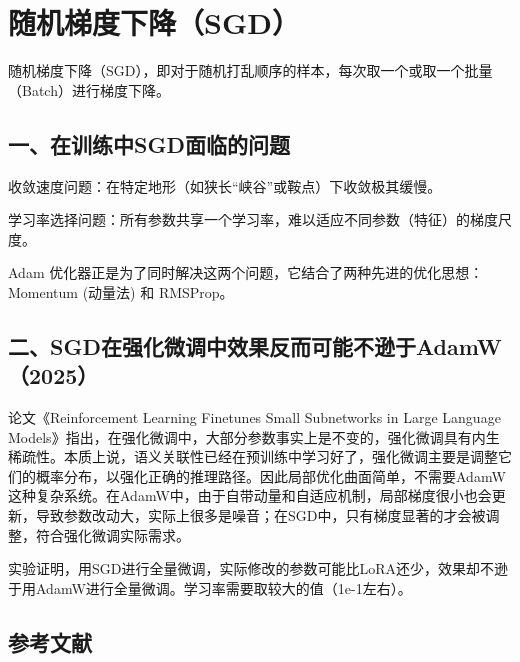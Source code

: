 \setcounter{section}{0}

\hypertarget{ux968fux673aux68afux5ea6ux4e0bux964dsgd}{%
\section{随机梯度下降（SGD）}\label{ux968fux673aux68afux5ea6ux4e0bux964dsgd}}

随机梯度下降（SGD），即对于随机打乱顺序的样本，每次取一个或取一个批量（Batch）进行梯度下降。

\hypertarget{ux4e00ux5728ux8badux7ec3ux4e2dsgdux9762ux4e34ux7684ux95eeux9898}{%
\subsection{一、在训练中SGD面临的问题}\label{ux4e00ux5728ux8badux7ec3ux4e2dsgdux9762ux4e34ux7684ux95eeux9898}}

收敛速度问题：在特定地形（如狭长``峡谷''或鞍点）下收敛极其缓慢。

学习率选择问题：所有参数共享一个学习率，难以适应不同参数（特征）的梯度尺度。

Adam 优化器正是为了同时解决这两个问题，它结合了两种先进的优化思想：Momentum (动量法) 和 RMSProp。

\hypertarget{ux4e8csgdux5728ux5f3aux5316ux5faeux8c03ux4e2dux6548ux679cux53cdux800cux53efux80fdux4e0dux900aux4e8eadamw2025}{%
\subsection{二、SGD在强化微调中效果反而可能不逊于AdamW（2025）}\label{ux4e8csgdux5728ux5f3aux5316ux5faeux8c03ux4e2dux6548ux679cux53cdux800cux53efux80fdux4e0dux900aux4e8eadamw2025}}

论文《Reinforcement Learning Finetunes Small Subnetworks in Large Language Models》指出，在强化微调中，大部分参数事实上是不变的，强化微调具有内生稀疏性。本质上说，语义关联性已经在预训练中学习好了，强化微调主要是调整它们的概率分布，以强化正确的推理路径。因此局部优化曲面简单，不需要AdamW这种复杂系统。在AdamW中，由于自带动量和自适应机制，局部梯度很小也会更新，导致参数改动大，实际上很多是噪音；在SGD中，只有梯度显著的才会被调整，符合强化微调实际需求。

实验证明，用SGD进行全量微调，实际修改的参数可能比LoRA还少，效果却不逊于用AdamW进行全量微调。学习率需要取较大的值（1e-1左右）。

\FloatBarrier
{}
\hypertarget{ux53c2ux8003ux6587ux732e-25}{%
\subsection{参考文献}\label{ux53c2ux8003ux6587ux732e-25}}

